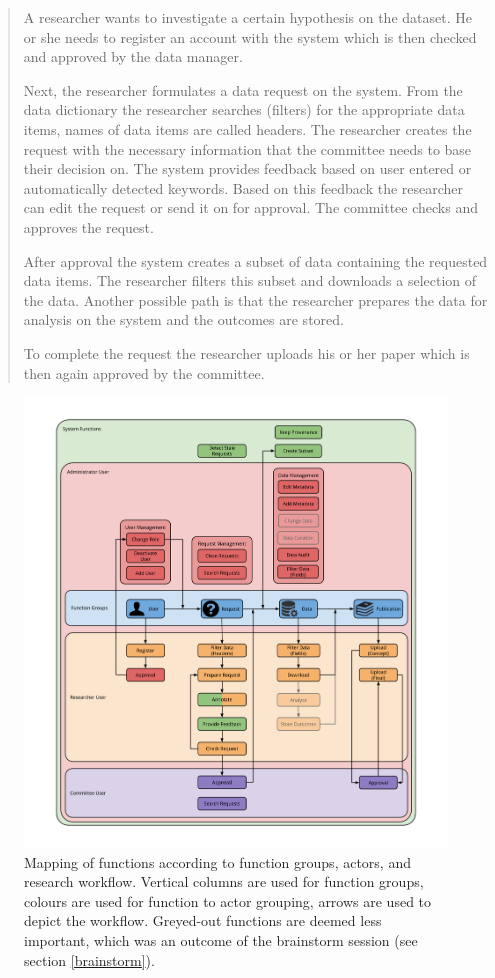 \begin{quotation}
	\noindent A researcher wants to investigate a certain hypothesis on the \project{} dataset.
	He or she needs to register an account with the system which is then checked and approved by the data manager.
	
	Next, the researcher formulates a data request on the system.
	From the data dictionary the researcher searches (filters) for the appropriate data items, names of data items are called headers.
	The researcher creates the request with the necessary information that the committee needs to base their decision on.
	The system provides feedback based on user entered or automatically detected keywords.
	Based on this feedback the researcher can edit the request or send it on for approval.
	The committee checks and approves the request.
	
	After approval the system creates a subset of \project{} data containing the requested data items.
	The researcher filters this subset and downloads a selection of the data.
	Another possible path is that the researcher prepares the data for analysis on the system and the outcomes are stored.
	
	To complete the request the researcher uploads his or her paper which is then again approved by the committee.
\end{quotation}

\begin{figure}[!htb]
	\centering
	\includegraphics[width=1.0\linewidth]{images/functions-in-workflow}
	\caption{
		Mapping of functions according to function groups, actors, and research workflow.
		Vertical columns are used for function groups, colours are used for function to actor grouping, arrows are used to depict the workflow.
		Greyed-out functions are deemed less important, which was an outcome of the brainstorm session (see section \ref{brainstorm}).
	}
	\label{fig:functions-workflow}
\end{figure}